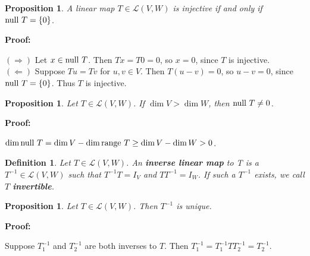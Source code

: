 \documentclass{article}
\theoremstyle{colontheorem}
\newtheorem{proposition}[theorem]{Proposition}
\newtheorem{definition}[theorem]{Definition}
\newcommand{\Null}{\textnormal{null }}
\newcommand{\Range}{\textnormal{range }}
\newenvironment{Proposition}
{
	\begin{mdframed}[backgroundcolor=TheoremOrange!10]
	\begin{proposition}
}
{
	\end{proposition}
	\end{mdframed}
	
	\vspace{.15in}
}
\newenvironment{Def}
{
	\begin{mdframed}[backgroundcolor=DefGreen!10]
	\begin{definition}
}
{
	\end{definition}
	\end{mdframed}
	
	\vspace{.15in}
}
\newenvironment{Proof}
{
	\vspace{-.3in}
	
	\begin{mdframed}[backgroundcolor=ProofPurple!10]
	\textbf{Proof:}%
}
{
	\end{mdframed}
	
	\vspace{.15in}
}
\begin{document}
\begin{Proposition}
	
	A linear map $T \in \mathcal{L}(V,W)$ is injective if and only if $\Null T = \{0\}$.
	
\end{Proposition}



\begin{Proof}
	$(\Rightarrow)$ Let $x \in \Null T$. Then $Tx = T0 = 0$, so $x = 0$, since $T$ is injective.\\
	
	$(\Leftarrow)$ Suppose $Tu = Tv$ for $u, v \in V$. Then $T(u-v) = 0$, so $u - v = 0$, since $\Null T = \{0\}$. Thus $T$ is injective.
	
\end{Proof}




\begin{Proposition}
	
	Let $T \in \mathcal{L}(V,W)$. If $\dim V > \dim W$, then $\Null T \neq 0$.
	
\end{Proposition}



\begin{Proof}
	$\dim \Null T = \dim V - \dim \Range T \geq \dim V - \dim W > 0$.
	
\end{Proof}



\begin{Def}
	
	Let $T \in \mathcal{L}(V,W)$. An \textbf{inverse linear map} to T is a $T^{-1} \in \mathcal{L}(V,W)$ such that $T^{-1}T = I_V$ and $TT^{-1} = I_W$. If such a $T^{-1}$ exists, we call $T$ \textbf{invertible}.
	
\end{Def}



\begin{Proposition}
	
	Let $T \in \mathcal{L}(V,W)$. Then $T^{-1}$ is unique.
	
\end{Proposition}



\begin{Proof}
	Suppose $T^{-1}_1$ and $T^{-1}_2$ are both inverses to $T$. Then $T^{-1}_1 = T^{-1}_1 T T^{-1}_2 = T^{-1}_2$.
	
\end{Proof}
\end{document}
